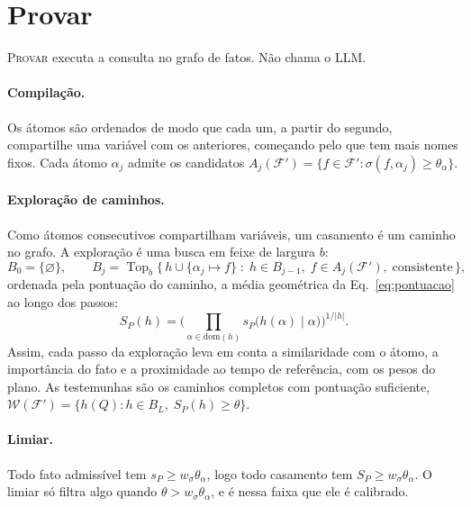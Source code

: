\documentclass[11pt]{article}
\theoremstyle{definition}
\theoremstyle{plain}
\newcommand{\op}[1]{\textsc{#1}}
\newcommand{\F}{\mathcal{F}}          %
\newcommand{\W}{\mathcal{W}}          %
\newcommand{\Top}{\operatorname{Top}}
\begin{document}
\section{Provar}
\label{sec:provar}

\op{Provar} executa a consulta no grafo de fatos. Não chama o LLM.

\paragraph{Compilação.} Os átomos são ordenados de modo que cada um, a partir
do segundo, compartilhe uma variável com os anteriores, começando pelo que tem
mais nomes fixos. Cada átomo $\alpha_j$ admite os candidatos
$A_j(\F')=\{f\in\F':\sigma(f,\alpha_j)\ge\theta_\alpha\}$.

\paragraph{Exploração de caminhos.} Como átomos consecutivos compartilham
variáveis, um casamento é um caminho no grafo. A exploração é uma busca em
feixe de largura $b$:
\begin{equation}
\label{eq:feixe}
B_0=\{\varnothing\},\qquad
B_j=\Top_b\big\{\,h\cup\{\alpha_j\mapsto f\}\;:\;h\in B_{j-1},\;f\in A_j(\F'),\;
\text{consistente}\,\big\},
\end{equation}
ordenada pela pontuação do caminho, a média geométrica da
Eq.~\eqref{eq:pontuacao} ao longo dos passos:
\begin{equation}
\label{eq:caminho}
S_P(h)=\Big(\prod_{\alpha\in\mathrm{dom}(h)}s_P\big(h(\alpha)\mid\alpha\big)\Big)^{1/|h|}.
\end{equation}
Assim, cada passo da exploração leva em conta a similaridade com o átomo, a
importância do fato e a proximidade ao tempo de referência, com os pesos do
plano. As testemunhas são os caminhos completos com pontuação suficiente,
$\W(\F')=\{h(Q):h\in B_L,\;S_P(h)\ge\theta\}$.

\paragraph{Limiar.} Todo fato admissível tem $s_P\ge w_\sigma\theta_\alpha$, logo
todo casamento tem $S_P\ge w_\sigma\theta_\alpha$. O limiar só filtra algo
quando $\theta>w_\sigma\theta_\alpha$, e é nessa faixa que ele é calibrado.
\end{document}
